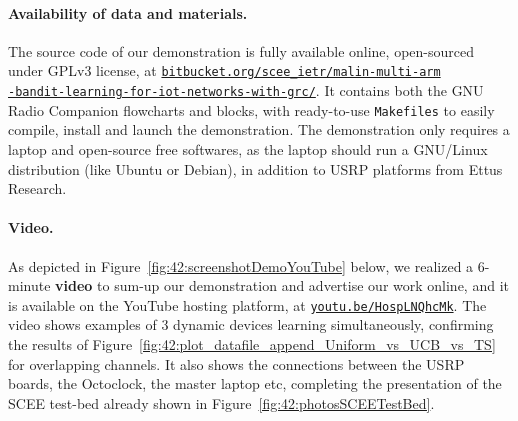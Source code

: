 

\paragraph{Availability of data and materials.}
%
The source code of our demonstration is fully available online, open-sourced under GPLv3 license, at
\href{https://bitbucket.org/scee_ietr/malin-multi-arm-bandit-learning-for-iot-networks-with-grc}{\texttt{bitbucket.org/scee\_ietr/malin-multi-arm\\-bandit-learning-for-iot-networks-with-grc/}}.
%
It contains both the GNU Radio Companion flowcharts and blocks, with ready-to-use \texttt{Makefiles} to easily compile, install and launch the demonstration.
The demonstration only requires a laptop and open-source free softwares,
as the laptop should run a GNU/Linux distribution (like Ubuntu or Debian),
in addition to USRP platforms from Ettus Research.


\paragraph{Video.}
%
As depicted in Figure~\ref{fig:42:screenshotDemoYouTube} below,
we realized a $6$-minute \textbf{video} to sum-up our demonstration and advertise our work online, and it is available on the YouTube hosting platform, at \texttt{\href{https://youtu.be/HospLNQhcMk}{youtu.be/HospLNQhcMk}}.
The video shows examples of $3$ dynamic devices learning simultaneously, confirming the results of Figure~\ref{fig:42:plot_datafile_append_Uniform_vs_UCB_vs_TS} for overlapping channels.
It also shows the connections between the USRP boards, the Octoclock, the master laptop etc, completing the presentation of the SCEE test-bed already shown in Figure~\ref{fig:42:photosSCEETestBed}.

